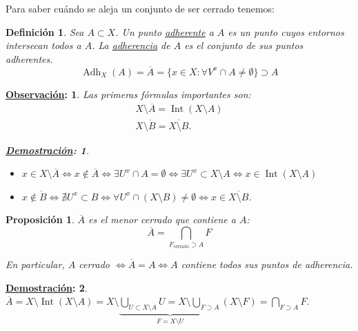 \documentclass[10pt,a4paper,openright]{book}
\theoremstyle{break}
\newtheorem*{defi}{Definición}
\newtheorem*{prop}{Proposición}
\newtheorem*{demo}{\underline{Demostración}:}
\newtheorem*{obs}{\underline{Observación}:}
\DeclareMathOperator{\inter}{Int}
\DeclareMathOperator{\adh}{Adh}
\begin{document}
Para saber cuándo se aleja un conjunto de ser cerrado tenemos:
\begin{defi}
Sea $A \subset X$. Un punto \underline{adherente} a $A$ es un punto cuyos entornos intersecan todos a $A$. La \underline{adherencia} de $A$ es el conjunto de sus puntos adherentes. 
\[
\adh_X\left( A \right) = \overline{A} = \{x \in X: \forall V^x \cap A \neq \emptyset\} \supset A
\]
\end{defi}

\begin{obs}
Las primeras fórmulas importantes son:
\begin{gather*}
    \boxed{X \setminus \overline{A} = \inter\left( X \setminus A \right)} \\
    \boxed{X \setminus \mathring{B} = \overline{X \setminus B}} 
.\end{gather*}
\begin{demo}
\begin{itemize}
    \item $x \in X \setminus \overline{A} \Leftrightarrow x \not\in \overline{A} \Leftrightarrow \exists U^x \cap A = \emptyset \Leftrightarrow \exists U^x \subset X \setminus A \Leftrightarrow x \in \inter\left( X \setminus A \right)$
    \item $x \not\in \mathring{B} \Leftrightarrow \nexists U^x \subset B \Leftrightarrow \forall U^x \cap \left( X \setminus B \right) \neq \emptyset \Leftrightarrow x \in \overline{X \setminus B}$.
\end{itemize}
\end{demo}
\end{obs}

\begin{prop}
$\overline{A}$ es el menor cerrado que contiene a $A$: 
\[
    \boxed{\overline{A} = \bigcap_{F_{\text{cerrado}} \supset A} F } 
\]

En particular, $A$ cerrado $\Leftrightarrow \overline{A} = A \Leftrightarrow A$ contiene todos sus puntos de adherencia.
\end{prop}
\begin{demo}
$\overline{A} = X \setminus \inter\left( X \setminus A \right) = X \setminus \underbrace{\bigcup_{U \subset X \setminus A} U = X \setminus \bigcup_{F \supset A}}_{F = X \setminus U} \left( X \setminus F \right) = \bigcap_{F \supset A} F$.
\end{demo}
\end{document}

